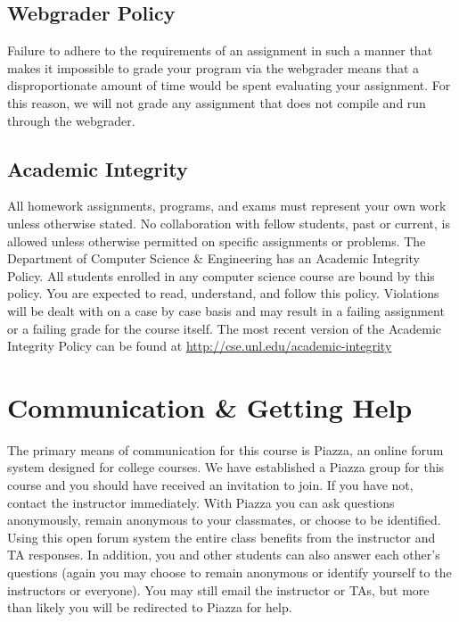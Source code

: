 \documentclass[12pt]{scrartcl}
\begin{document}
\subsection{Webgrader Policy}

Failure to adhere to the requirements of an assignment in such 
a manner that makes it impossible to grade your program via 
the webgrader means that a disproportionate amount of time 
would be spent evaluating your assignment.  For this reason, 
we will not grade any assignment that does not compile and 
run through the webgrader.  

\subsection{Academic Integrity}

All homework assignments, programs, and exams must represent
your own work unless otherwise stated.  No collaboration with 
fellow students, past or current, is allowed unless otherwise 
permitted on specific assignments or problems.  The Department of
Computer Science \& Engineering has an Academic Integrity Policy.  
All students enrolled in any computer science course are bound 
by this policy.  You are expected to read, understand, and follow 
this policy.  Violations will be dealt with on a case by case 
basis and may result in a failing assignment or a failing grade 
for the course itself.  The most recent version of the Academic 
Integrity Policy can be found at \url{http://cse.unl.edu/academic-integrity}

\section{Communication \& Getting Help}

The primary means of communication for this course is Piazza, an online
forum system designed for college courses.  We have established a Piazza 
group for this course and you should have received an invitation to join.
If you have not, contact the instructor immediately.  With Piazza you 
can ask questions anonymously, remain anonymous to your classmates, or 
choose to be identified.  Using this open forum system the entire class 
benefits from the instructor and TA responses.  In addition, you and 
other students can also answer each other's questions (again you may
choose to remain anonymous or identify yourself to the instructors or
everyone).  You may still email the instructor or TAs, but more than 
likely you will be redirected to Piazza for help.
\end{document}
